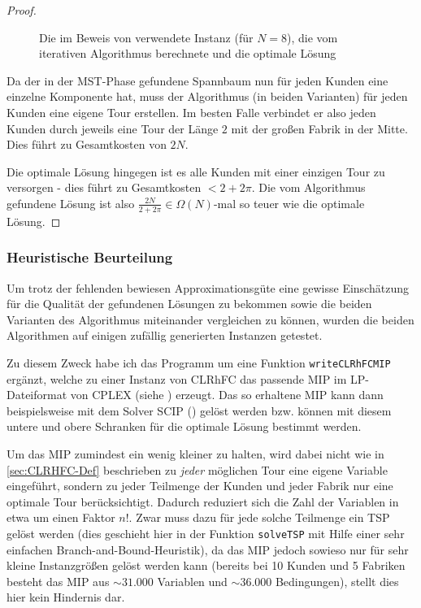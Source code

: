 \documentclass[a4paper,ngerman,11pt,bibtotoc]{scrartcl}
\theoremstyle{definition}
\theoremstyle{plain}
\theoremstyle{remark}
\newcommand{\CLRHFC}{CLRhFC}
\newcommand{\MST}{MST}
\begin{document}
\begin{proof}
\begin{figure}[h]
		\caption{Die im Beweis von  verwendete Instanz (für $N=8$), die vom iterativen Algorithmus berechnete und die optimale Lösung}\label{fig:bsp:schlechterApproximationsguete}
		\end{figure}
		Da der in der \MST-Phase gefundene Spannbaum nun für jeden Kunden eine einzelne Komponente hat, muss der Algorithmus (in beiden Varianten) für jeden Kunden eine eigene Tour erstellen. Im besten Falle verbindet er also jeden Kunden durch jeweils eine Tour der Länge $2$ mit der großen Fabrik in der Mitte. Dies führt zu Gesamtkosten von $2N$.
		
		Die optimale Lösung hingegen ist es alle Kunden mit einer einzigen Tour zu versorgen - dies führt zu Gesamtkosten $< 2 + 2\pi$. Die vom Algorithmus gefundene Lösung ist also $\frac{2N}{2+2\pi} \in \Omega(N)$-mal so teuer wie die optimale Lösung.		
	\end{proof}
		
	\subsubsection{Heuristische Beurteilung}
	
	Um trotz der fehlenden bewiesen Approximationsgüte eine gewisse Einschätzung für die Qualität der gefundenen Lösungen zu bekommen sowie die beiden Varianten des Algorithmus miteinander vergleichen zu können, wurden die beiden Algorithmen auf einigen zufällig generierten Instanzen getestet. 
	
	Zu diesem Zweck habe ich das Programm um eine Funktion \lstinline|writeCLRhFCMIP| ergänzt, welche zu einer Instanz von \CLRHFC{} das passende MIP im LP-Dateiformat von CPLEX (siehe \cite{LPFileFormat}) erzeugt. Das so erhaltene MIP kann dann beispielsweise mit dem Solver SCIP (\cite{SCIP}) gelöst werden bzw. können mit diesem untere und obere Schranken für die optimale Lösung bestimmt werden.
	
	Um das MIP zumindest ein wenig kleiner zu halten, wird dabei nicht wie in \cref{sec:CLRHFC-Def} beschrieben zu \emph{jeder} möglichen Tour eine eigene Variable eingeführt, sondern zu jeder Teilmenge der Kunden und jeder Fabrik nur eine optimale Tour berücksichtigt. Dadurch reduziert sich die Zahl der Variablen in etwa um einen Faktor $n!$. Zwar muss dazu für jede solche Teilmenge ein TSP gelöst werden (dies geschieht hier in der Funktion \lstinline|solveTSP| mit Hilfe einer sehr einfachen Branch-and-Bound-Heuristik), da das MIP jedoch sowieso nur für sehr kleine Instanzgrößen gelöst werden kann (bereits bei 10 Kunden und 5 Fabriken besteht das MIP aus $\sim 31.000$ Variablen und $\sim 36.000$ Bedingungen), stellt dies hier kein Hindernis dar.
\end{document}
